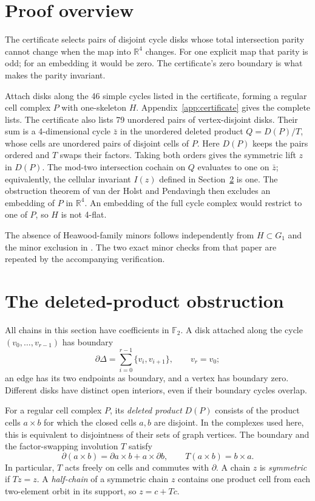 \documentclass[11pt]{article}
\newcommand{\F}{\mathbb F_2}
\newcommand{\R}{\mathbb R}
\begin{document}
\section{Proof overview}
The certificate selects pairs of disjoint cycle disks whose total
intersection parity cannot change when the map into $\R^4$ changes.
For one explicit map that parity is odd; for an embedding it would be
zero. The certificate's zero boundary is what makes the parity invariant.

Attach disks along the 46 simple cycles listed in the certificate,
forming a regular cell complex $P$ with one-skeleton $H$.
Appendix~\ref{app:certificate} gives the complete lists.
The certificate also lists 79 unordered pairs of vertex-disjoint disks.
Their sum is a 4-dimensional cycle $\bar z$ in the unordered deleted product
$Q=D(P)/T$, whose cells are unordered pairs of disjoint cells of $P$.
Here $D(P)$ keeps the pairs ordered and $T$ swaps their factors.
Taking both orders gives the symmetric lift $z$ in $D(P)$.
The mod-two intersection cochain on $Q$ evaluates to one on $\bar z$;
equivalently, the cellular invariant $I(z)$ defined in
Section~\ref{sec:obstruction} is one. The obstruction theorem of
van der Holst and Pendavingh then excludes an embedding of $P$ in
$\R^4$. An embedding of the full cycle complex would restrict to one
of $P$, so $H$ is not 4-flat.

The absence of Heawood-family minors follows independently from
$H\subset G_1$ and the minor exclusion in \cite{Graham}.
The two exact minor checks from that paper are repeated by the
accompanying verification.

\section{The deleted-product obstruction}\label{sec:obstruction}
All chains in this section have coefficients in $\F$.
A disk attached along the cycle $(v_0,\ldots,v_{r-1})$ has boundary
\[
\partial\Delta=\sum_{i=0}^{r-1}\{v_i,v_{i+1}\},
\qquad v_r=v_0;
\]
an edge has its two endpoints as boundary, and a vertex has boundary zero.
Different disks have distinct open interiors, even if their boundary
cycles overlap.

For a regular cell complex $P$, its \emph{deleted product} $D(P)$
consists of the product cells $a\times b$ for which the closed cells
$a,b$ are disjoint. In the complexes used here, this is equivalent to
disjointness of their sets of graph vertices. The boundary and the
factor-swapping involution $T$ satisfy
\[
\partial(a\times b)=\partial a\times b+a\times\partial b,
\qquad T(a\times b)=b\times a.
\]
In particular, $T$ acts freely on cells and commutes with $\partial$.
A chain $z$ is \emph{symmetric} if $Tz=z$.
A \emph{half-chain} of a symmetric chain $z$ contains one product cell
from each two-element orbit in its support, so $z=c+Tc$.
\end{document}
